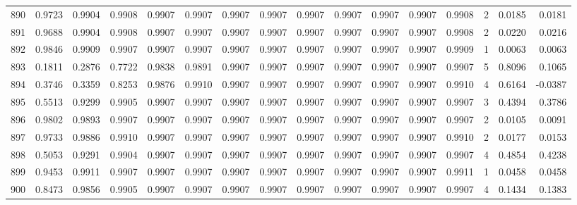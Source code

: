 \begin{tabular}{lrrrrrrrrrrrrrrr}
890 &      0.9723 &  0.9904 &  0.9908 &  0.9907 &  0.9907 &  0.9907 &  0.9907 &  0.9907 &  0.9907 &  0.9907 &   0.9907 &     0.9908 &      2 &                    0.0185 &                     0.0181 \\
891 &      0.9688 &  0.9904 &  0.9908 &  0.9907 &  0.9907 &  0.9907 &  0.9907 &  0.9907 &  0.9907 &  0.9907 &   0.9907 &     0.9908 &      2 &                    0.0220 &                     0.0216 \\
892 &      0.9846 &  0.9909 &  0.9907 &  0.9907 &  0.9907 &  0.9907 &  0.9907 &  0.9907 &  0.9907 &  0.9907 &   0.9907 &     0.9909 &      1 &                    0.0063 &                     0.0063 \\
893 &      0.1811 &  0.2876 &  0.7722 &  0.9838 &  0.9891 &  0.9907 &  0.9907 &  0.9907 &  0.9907 &  0.9907 &   0.9907 &     0.9907 &      5 &                    0.8096 &                     0.1065 \\
894 &      0.3746 &  0.3359 &  0.8253 &  0.9876 &  0.9910 &  0.9907 &  0.9907 &  0.9907 &  0.9907 &  0.9907 &   0.9907 &     0.9910 &      4 &                    0.6164 &                    -0.0387 \\
895 &      0.5513 &  0.9299 &  0.9905 &  0.9907 &  0.9907 &  0.9907 &  0.9907 &  0.9907 &  0.9907 &  0.9907 &   0.9907 &     0.9907 &      3 &                    0.4394 &                     0.3786 \\
896 &      0.9802 &  0.9893 &  0.9907 &  0.9907 &  0.9907 &  0.9907 &  0.9907 &  0.9907 &  0.9907 &  0.9907 &   0.9907 &     0.9907 &      2 &                    0.0105 &                     0.0091 \\
897 &      0.9733 &  0.9886 &  0.9910 &  0.9907 &  0.9907 &  0.9907 &  0.9907 &  0.9907 &  0.9907 &  0.9907 &   0.9907 &     0.9910 &      2 &                    0.0177 &                     0.0153 \\
898 &      0.5053 &  0.9291 &  0.9904 &  0.9907 &  0.9907 &  0.9907 &  0.9907 &  0.9907 &  0.9907 &  0.9907 &   0.9907 &     0.9907 &      4 &                    0.4854 &                     0.4238 \\
899 &      0.9453 &  0.9911 &  0.9907 &  0.9907 &  0.9907 &  0.9907 &  0.9907 &  0.9907 &  0.9907 &  0.9907 &   0.9907 &     0.9911 &      1 &                    0.0458 &                     0.0458 \\
900 &      0.8473 &  0.9856 &  0.9905 &  0.9907 &  0.9907 &  0.9907 &  0.9907 &  0.9907 &  0.9907 &  0.9907 &   0.9907 &     0.9907 &      4 &                    0.1434 &                     0.1383 \\

\end{tabular}
